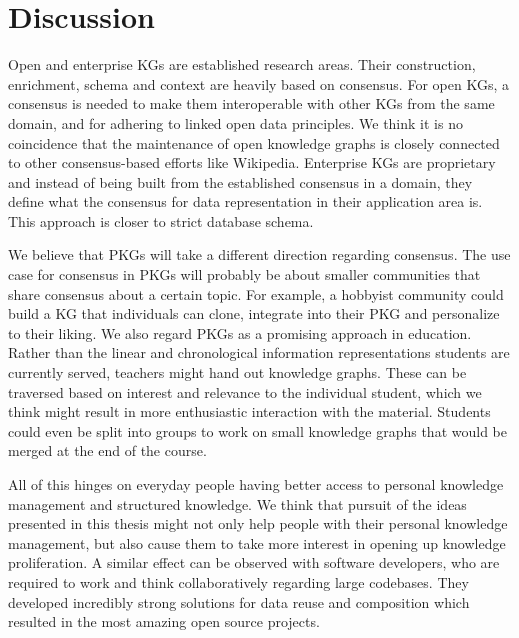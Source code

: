 \chapter{Discussion} \label{ch:discussion}

Open and enterprise KGs are established research areas. Their construction, enrichment, schema and context are heavily based on consensus. For open KGs, a consensus is needed to make them interoperable with other KGs from the same domain, and for adhering to linked open data principles. We think it is no coincidence that the maintenance of open knowledge graphs is closely connected to other consensus-based efforts like Wikipedia. Enterprise KGs are proprietary and instead of being built from the established consensus in a domain, they define what the consensus for data representation in their application area is. This approach is closer to strict database schema. 

We believe that PKGs will take a different direction regarding consensus. The use case for consensus in PKGs will probably be about smaller communities that share consensus about a certain topic. For example, a hobbyist community could build a KG that individuals can clone, integrate into their PKG and personalize to their liking. We also regard PKGs as a promising approach in education. Rather than the linear and chronological information representations students are currently served, teachers might hand out knowledge graphs. These can be traversed based on interest and relevance to the individual student, which we think might result in more enthusiastic interaction with the material. Students could even be split into groups to work on small knowledge graphs that would be merged at the end of the course.

All of this hinges on everyday people having better access to personal knowledge management and structured knowledge. We think that pursuit of the ideas presented in this thesis might not only help people with their personal knowledge management, but also cause them to take more interest in opening up knowledge proliferation. A similar effect can be observed with software developers, who are required to work and think collaboratively regarding large codebases. They developed incredibly strong solutions for data reuse and composition which resulted in the most amazing open source projects. 